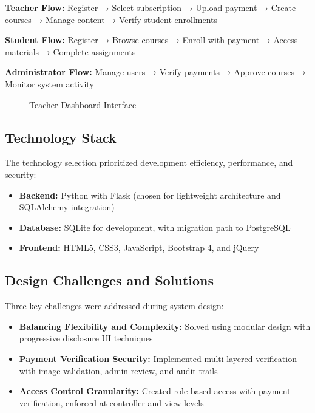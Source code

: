 \textbf{Teacher Flow:} Register → Select subscription → Upload payment → Create courses → Manage content → Verify student enrollments

\textbf{Student Flow:} Register → Browse courses → Enroll with payment → Access materials → Complete assignments

\textbf{Administrator Flow:} Manage users → Verify payments → Approve courses → Monitor system activity

\begin{figure}[h]
\centering
\caption{Teacher Dashboard Interface}
\label{fig:teacher-dashboard}
\end{figure}

\subsection{Technology Stack}

The technology selection prioritized development efficiency, performance, and security:

\begin{itemize}
    \item \textbf{Backend:} Python with Flask (chosen for lightweight architecture and SQLAlchemy integration)
    \item \textbf{Database:} SQLite for development, with migration path to PostgreSQL
    \item \textbf{Frontend:} HTML5, CSS3, JavaScript, Bootstrap 4, and jQuery
\end{itemize}

\subsection{Design Challenges and Solutions}

Three key challenges were addressed during system design:

\begin{itemize}
    \item \textbf{Balancing Flexibility and Complexity:} Solved using modular design with progressive disclosure UI techniques
    
    \item \textbf{Payment Verification Security:} Implemented multi-layered verification with image validation, admin review, and audit trails
    
    \item \textbf{Access Control Granularity:} Created role-based access with payment verification, enforced at controller and view levels
\end{itemize}